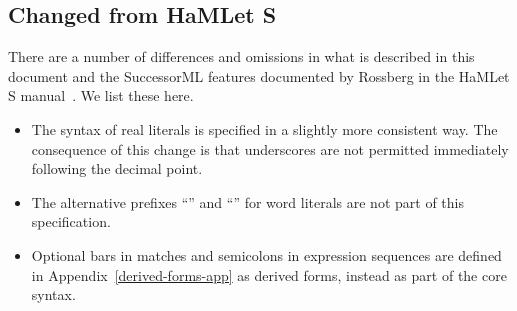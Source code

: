 \subsection{Changed from HaMLet S}
There are a number of differences and omissions in what is described in this document
and the SuccessorML features documented by Rossberg in the HaMLet S manual~\cite{hamlet-s}.
We list these here.
\begin{itemize}
  \item
    The syntax of real literals is specified in a slightly more consistent way.  The consequence of this
    change is that underscores are not permitted immediately following the decimal point.
  \item
    The alternative prefixes ``'' and ``'' for word literals are not part of
    this specification.
  \item
    Optional bars in matches and semicolons in expression sequences are defined
    in Appendix~\ref{derived-forms-app} as derived forms, instead as part of the core syntax.
\end{itemize}%
